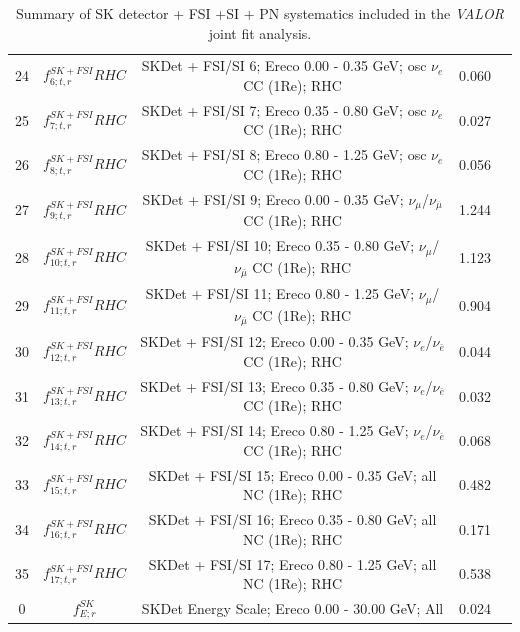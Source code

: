 {\begin{table}
\begin{tabular}{| c | c | c | c | c |}
24     &   $f_{6; t, r}^{SK+FSI}RHC$  & SKDet + FSI/SI  6; Ereco  0.00 - 0.35 GeV; osc $\nu_e$ CC (1Re); RHC              & 0.060      \\ 
25     &   $f_{7; t, r}^{SK+FSI}RHC$  & SKDet + FSI/SI  7; Ereco  0.35 - 0.80 GeV; osc $\nu_e$ CC (1Re); RHC              & 0.027      \\ 
26    &    $f_{8; t, r}^{SK+FSI}RHC$  & SKDet + FSI/SI  8; Ereco  0.80 - 1.25 GeV; osc $\nu_e$ CC (1Re); RHC              & 0.056      \\ 
27    &    $f_{9; t, r}^{SK+FSI}RHC$  & SKDet + FSI/SI  9; Ereco  0.00 - 0.35 GeV; $\nu_{\mu}$/$\nu_{\bar{\mu}}$ CC (1Re); RHC     & 1.244      \\ 
28    &   $f_{10; t, r}^{SK+FSI}RHC$   & SKDet + FSI/SI 10; Ereco  0.35 - 0.80 GeV; $\nu_{\mu}$/$\nu_{\bar{\mu}}$ CC (1Re); RHC    & 1.123      \\ 
29    &   $f_{11; t, r}^{SK+FSI}RHC$   & SKDet + FSI/SI 11; Ereco  0.80 - 1.25 GeV; $\nu_{\mu}$/$\nu_{\bar{\mu}}$ CC (1Re); RHC    & 0.904      \\ 
30    &   $f_{12; t, r}^{SK+FSI}RHC$   & SKDet + FSI/SI 12; Ereco  0.00 - 0.35 GeV; $\nu_{e}$/$\nu_{\bar{e}}$ CC (1Re); RHC         & 0.044      \\ 
31    &   $f_{13; t, r}^{SK+FSI}RHC$   & SKDet + FSI/SI 13; Ereco  0.35 - 0.80 GeV; $\nu_{e}$/$\nu_{\bar{e}}$ CC (1Re); RHC        & 0.032      \\ 
32    &   $f_{14; t, r}^{SK+FSI}RHC$   & SKDet + FSI/SI 14; Ereco  0.80 - 1.25 GeV; $\nu_{e}$/$\nu_{\bar{e}}$ CC (1Re); RHC        & 0.068      \\ 
33    &   $f_{15; t, r}^{SK+FSI}RHC$   & SKDet + FSI/SI 15; Ereco  0.00 - 0.35 GeV; all NC (1Re); RHC                         & 0.482      \\ 
34    &   $f_{16; t, r}^{SK+FSI}RHC$   & SKDet + FSI/SI 16; Ereco  0.35 - 0.80 GeV; all NC (1Re); RHC                         & 0.171      \\ 
35    &   $f_{17; t, r}^{SK+FSI}RHC$   & SKDet + FSI/SI 17; Ereco  0.80 - 1.25 GeV; all NC (1Re); RHC                         & 0.538      \\ 

\hline

0 	& 	$f_{E; r}^{SK}$ 			& SKDet Energy Scale; Ereco 0.00 - 30.00 GeV; All						& 0.024	\\

\hline

\end{tabular}

\caption{
Summary of SK detector + FSI +SI + PN systematics included in the {\em VALOR} joint fit analysis.
    }
\label{tab:banff_uncertainties_skdetfsi}
\end{table}
}

\clearpage
